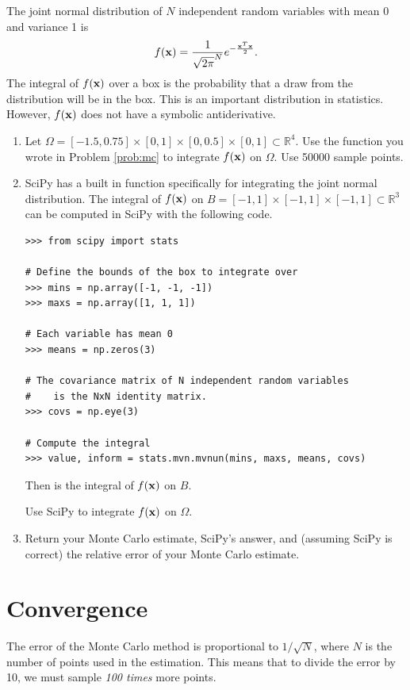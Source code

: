 \begin{problem}
The joint normal distribution of $N$ independent random variables with mean 0 and variance 1 is
\[
f(\mathbf{x}) = \frac{1}{\sqrt{2 \pi}^N} e^{- \frac{\mathbf{x}^T\mathbf{x}}{2}}.
\]
The integral of $f(\mathbf{x})$ over a box is the probability that a draw from the distribution will be in the box.
This is an important distribution in statistics.
However, $f(\mathbf{x})$ does not have a symbolic antiderivative.
\begin{enumerate}
\item Let $\Omega=[-1.5, 0.75]\times[0,1]\times[0, 0.5]\times[0,1] \subset \mathbb{R}^4$.
Use the function you wrote in Problem \ref{prob:mc} to integrate $f(\mathbf{x})$ on $\Omega$.
Use 50000 sample points.
\item SciPy has a built in function specifically for integrating the joint normal distribution.
The integral of $f(\mathbf{x})$ on $B = [-1,1]\times [-1,1]\times[-1,1] \subset \mathbb{R}^3$ can be computed in SciPy with the following code.

\begin{lstlisting}
>>> from scipy import stats

# Define the bounds of the box to integrate over
>>> mins = np.array([-1, -1, -1])
>>> maxs = np.array([1, 1, 1])

# Each variable has mean 0
>>> means = np.zeros(3)

# The covariance matrix of N independent random variables
#    is the NxN identity matrix.
>>> covs = np.eye(3)

# Compute the integral
>>> value, inform = stats.mvn.mvnun(mins, maxs, means, covs)
\end{lstlisting}

Then  is the integral of $f(\mathbf{x})$ on $B$.

Use SciPy to integrate $f(\mathbf{x})$ on $\Omega$.

\item Return your Monte Carlo estimate, SciPy's answer, and (assuming SciPy is correct) the relative error of your Monte Carlo estimate.
\end{enumerate}
\end{problem}

\section*{Convergence} %

The error of the Monte Carlo method is proportional to $1/\sqrt{N}$, where $N$ is the number of points used in the estimation.
This means that to divide the error by 10, we must sample \emph{100 times} more points.

